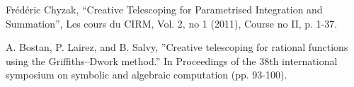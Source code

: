 \documentclass[a4paper,12pt]{article}
\numberwithin{equation}{section}
\numberwithin{figure}{section}
\begin{document}
\begin{thebibliography}{99}
 Fr\'ed\'eric Chyzak, ``Creative Telescoping for
  Parametrised Integration and Summation'',  Les cours du CIRM,  Vol. 2, no 1 (2011), Course no II, p. 1-37.

 A. Bostan, P. Lairez, and B. Salvy,
  ''Creative telescoping for rational functions using the
  Griffiths--Dwork method.'' In Proceedings of the 38th international
  symposium on symbolic and algebraic computation (pp. 93-100). 

	
	


\end{thebibliography}
\end{document}
